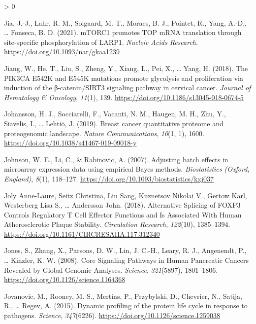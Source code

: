 \documentclass[
  12pt,
  openany]{book}
\newlength{\cslhangindent}
\newenvironment{CSLReferences}[2] %
 {%
  \setlength{\parindent}{0pt}
  \ifodd #1 \everypar{\setlength{\hangindent}{\cslhangindent}}\ignorespaces\fi
  \ifnum #2 > 0
  \setlength{\parskip}{#2\baselineskip}
  \fi
 }%
 {}
\begin{document}
\begin{CSLReferences}{1}{0}
\leavevmode\hypertarget{ref-Jia2021}{}%
Jia, J.-J., Lahr, R. M., Solgaard, M. T., Moraes, B. J., Pointet, R., Yang, A.-D., \ldots{} Fonseca, B. D. (2021). {mTORC1} promotes {TOP mRNA} translation through site-specific phosphorylation of {LARP1}. \emph{Nucleic Acids Research}. \url{https://doi.org/10.1093/nar/gkaa1239}

\leavevmode\hypertarget{ref-Jiang2018}{}%
Jiang, W., He, T., Liu, S., Zheng, Y., Xiang, L., Pei, X., \ldots{} Yang, H. (2018). The {PIK3CA E542K} and {E545K} mutations promote glycolysis and proliferation via induction of the β-catenin/{SIRT3} signaling pathway in cervical cancer. \emph{Journal of Hematology \& Oncology}, \emph{11}(1), 139. \url{https://doi.org/10.1186/s13045-018-0674-5}

\leavevmode\hypertarget{ref-Johansson2019}{}%
Johansson, H. J., Socciarelli, F., Vacanti, N. M., Haugen, M. H., Zhu, Y., Siavelis, I., \ldots{} Lehtiö, J. (2019). Breast cancer quantitative proteome and proteogenomic landscape. \emph{Nature Communications}, \emph{10}(1, 1), 1600. \url{https://doi.org/10.1038/s41467-019-09018-y}

\leavevmode\hypertarget{ref-Johnson2007}{}%
Johnson, W. E., Li, C., \& Rabinovic, A. (2007). Adjusting batch effects in microarray expression data using empirical {Bayes} methods. \emph{Biostatistics (Oxford, England)}, \emph{8}(1), 118--127. \url{https://doi.org/10.1093/biostatistics/kxj037}

\leavevmode\hypertarget{ref-JolyAnne-Laure2018}{}%
Joly Anne-Laure, Seitz Christina, Liu Sang, Kuznetsov Nikolai V., Gertow Karl, Westerberg Lisa S., \ldots{} Andersson John. (2018). Alternative {Splicing} of {FOXP3 Controls Regulatory T Cell Effector Functions} and {Is Associated With Human Atherosclerotic Plaque Stability}. \emph{Circulation Research}, \emph{122}(10), 1385--1394. \url{https://doi.org/10.1161/CIRCRESAHA.117.312340}

\leavevmode\hypertarget{ref-Jones2008}{}%
Jones, S., Zhang, X., Parsons, D. W., Lin, J. C.-H., Leary, R. J., Angenendt, P., \ldots{} Kinzler, K. W. (2008). Core {Signaling Pathways} in {Human Pancreatic Cancers Revealed} by {Global Genomic Analyses}. \emph{Science}, \emph{321}(5897), 1801--1806. \url{https://doi.org/10.1126/science.1164368}

\leavevmode\hypertarget{ref-Jovanovic2015}{}%
Jovanovic, M., Rooney, M. S., Mertins, P., Przybylski, D., Chevrier, N., Satija, R., \ldots{} Regev, A. (2015). Dynamic profiling of the protein life cycle in response to pathogens. \emph{Science}, \emph{347}(6226). \url{https://doi.org/10.1126/science.1259038}


\end{CSLReferences}
\end{document}

